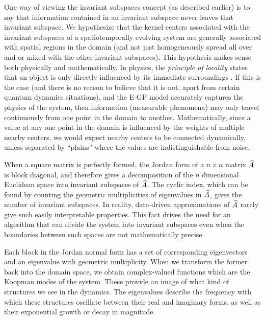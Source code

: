 One way of viewing the invariant subspaces concept (as described earlier) is to say that information contained in an invariant subspace never leaves that invariant subspace. We hypothesize that the kernel centers associated with the invariant subspaces of a spatiotemporally evolving system are generally associated with spatial regions in the domain (and not just homogeneously spread all over and or mixed with the other invariant subspaces). This hypothesis makes sense both physically and mathematically. In physics, the \emph{principle of locality} states that an object is only directly influenced by its immediate surroundings \cite{berkovitz2007action}. If this is the case (and there is no reason to believe that it is not, apart from certain quantum dynamics situations), and the E-GP model accurately captures the physics of the system, then information (measurable phenomena) may only travel continuously from one point in the domain to another. Mathematically, since a value at any one point in the domain is influenced by the weights of multiple nearby centers, we would expect nearby centers to be connected dynamically, unless separated by ``plains'' where the values are indistinguishable from noise.

When a square matrix is perfectly formed, the Jordan form of a $n\times n$ matrix $\widehat{A}$ is block diagonal, and therefore gives a decomposition of the $n$ dimensional Euclidean space into invariant subspaces of $\widehat{A}$. The cyclic index, which can be found by counting the geometric multiplicities of eigenvalues in $\widehat{A}$, gives the number of invariant subspaces. In reality, data-driven approximations of $\widehat{A}$ rarely give such easily interpretable properties. This fact drives the need for an algorithm that can divide the system into invariant subspaces even when the boundaries between such spaces are not mathematically precise.

Each block in the Jordan normal form has a set of corresponding eigenvectors and an eigenvalue with geometric multiplicity. When we transform the former back into the domain space, we obtain complex-valued functions which are the Koopman modes of the system. These provide an image of what kind of structures we see in the dynamics. The eigenvalues describe the frequency with which these structures oscillate between their real and imaginary forms, as well as their exponential growth or decay in magnitude. %


